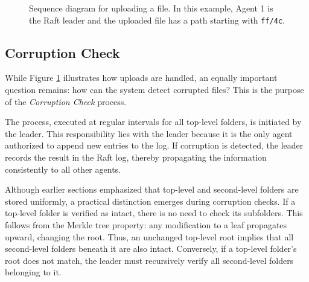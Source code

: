 \begin{figure}[!ht]
\caption{Sequence diagram for uploading a file. In this example, Agent 1 is the Raft leader and the uploaded file has a path starting with \texttt{ff/4c}.}
\label{fig:sequence-diagram-upload-file}
\end{figure}

\newpage
\subsection{Corruption Check} \label{sec:check-corruption}

While Figure \ref{fig:sequence-diagram-upload-file} illustrates how uploads are handled, an equally important question remains: how can the system detect corrupted files? This is the purpose of the \emph{Corruption Check} process.

The process, executed at regular intervals for all top-level folders, is initiated by the leader. This responsibility lies with the leader because it is the only agent authorized to append new entries to the log. If corruption is detected, the leader records the result in the Raft log, thereby propagating the information consistently to all other agents.

Although earlier sections emphasized that top-level and second-level folders are stored uniformly, a practical distinction emerges during corruption checks. If a top-level folder is verified as intact, there is no need to check its subfolders. This follows from the Merkle tree property: any modification to a leaf propagates upward, changing the root. Thus, an unchanged top-level root implies that all second-level folders beneath it are also intact. Conversely, if a top-level folder's root does not match, the leader must recursively verify all second-level folders belonging to it.


